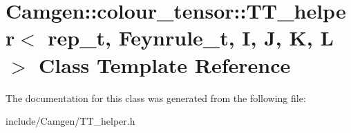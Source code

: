 \hypertarget{a00535}{\section{Camgen\-:\-:colour\-\_\-tensor\-:\-:T\-T\-\_\-helper$<$ rep\-\_\-t, Feynrule\-\_\-t, I, J, K, L $>$ Class Template Reference}
\label{a00535}
}


The documentation for this class was generated from the following file\-:\begin{DoxyCompactItemize}
\item 
include/\-Camgen/T\-T\-\_\-helper.\-h\end{DoxyCompactItemize}
